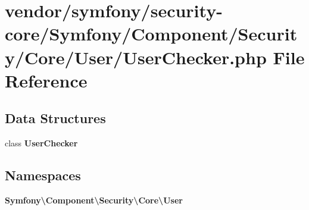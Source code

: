 \section{vendor/symfony/security-\/core/\+Symfony/\+Component/\+Security/\+Core/\+User/\+User\+Checker.php File Reference}
\label{_user_checker_8php}
\subsection*{Data Structures}
\begin{DoxyCompactItemize}
\item 
class {\bf User\+Checker}
\end{DoxyCompactItemize}
\subsection*{Namespaces}
\begin{DoxyCompactItemize}
\item 
 {\bf Symfony\textbackslash{}\+Component\textbackslash{}\+Security\textbackslash{}\+Core\textbackslash{}\+User}
\end{DoxyCompactItemize}
